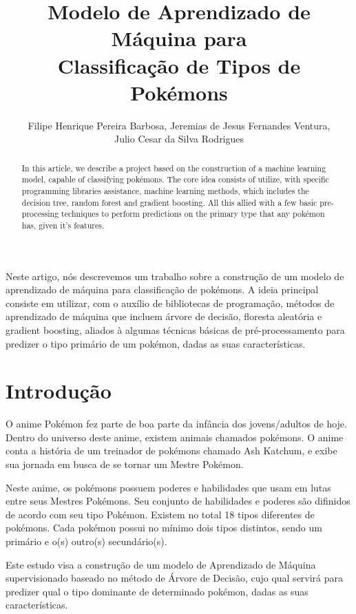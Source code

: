 \documentclass[12pt]{article}
\title{Modelo de Aprendizado de Máquina para\\ Classificação de Tipos de Pokémons}
\author{Filipe Henrique Pereira Barbosa\inst{1}, Jeremias de Jesus Fernandes Ventura\inst{1},\\Julio Cesar da Silva Rodrigues\inst{1}}
\begin{document}
 

\maketitle

\begin{abstract}
 
 In this article, we describe a project based on the construction of a machine learning model, capable of classifying pokémons. The core idea consists of utilize, with specific programming libraries assistance, machine learning methods, which includes the decision tree, random forest and gradient boosting. All this allied with a few basic pre-processing techniques to perform predictions on the primary type that any pokémon has, given it's features.
 
\end{abstract}
     
\begin{resumo} 
  
Neste artigo, nós descrevemos um trabalho sobre a construção de um modelo de aprendizado de máquina para classificação de pokémons. A ideia principal consiste em utilizar, com o auxílio de bibliotecas de programação, métodos de aprendizado de máquina que incluem árvore de decisão, floresta aleatória e gradient boosting, aliados à algumas técnicas básicas de pré-processamento para predizer o tipo primário de um pokémon, dadas as suas características. 

\end{resumo}

\section{Introdução}

O anime Pokémon fez parte de boa parte da infância dos jovens/adultos de hoje. Dentro do universo deste anime, existem animais chamados pokémons. O anime conta a história de um treinador de pokémons chamado Ash Katchum, e exibe sua jornada em busca de se tornar um Mestre Pokémon.

Neste anime, os pokémons possuem poderes e habilidades que usam em lutas entre seus Mestres Pokémons. Seu conjunto de habilidades e poderes são difinidos de acordo com seu tipo Pokémon. Existem no total 18 tipos diferentes de pokémons. Cada pokémon possui no mínimo dois tipos distintos, sendo um primário e o(s) outro(s) secundário(s).

Este estudo visa a construção de um modelo de Aprendizado de Máquina supervisionado baseado no método de Árvore de Decisão, cujo qual servirá para predizer qual o tipo dominante de determinado pokémon, dadas as suas características. 
\end{document}

